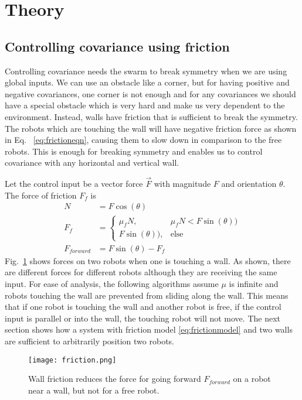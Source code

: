 \section{Theory}
\label{sec:theory}
\subsection{Controlling covariance using friction}

Controlling covariance needs the swarm to break symmetry when we are using global inputs. We can use an obstacle like a corner, but for having positive and negative covariances, one corner is not enough and for any covariances we should have a special obstacle which is very hard and make us very dependent to the environment. Instead, walls have friction that is sufficient to break the symmetry. The robots which are touching the wall will have negative friction force as shown in Eq. ~\ref{eq:frictioneqn}, causing them to slow down in comparison to the free robots. This is enough for breaking symmetry and enables us to control covariance with any horizontal and vertical wall. 
  
 Let the control input be a vector force $\vec{F}$ with magnitude $F$ and orientation $\theta$.  The force of friction $F_f$ is
\begin{align}
N &= F \cos(\theta) \nonumber\\
F_f &= \begin{cases}  \mu_f N, &  \mu_f N < F \sin(\theta))  \label{eq:frictionmodel} \\ 
F \sin(\theta)), & \text{else} \end{cases}  \\%
F_{forward} &=  F \sin(\theta) - F_f  \nonumber
\end{align}
 Fig.~\ref{fig:friction} shows  forces on two robots when one is touching a wall. As shown, there are different forces for different robots although they are receiving the same input.
  For ease of analysis, the following algorithms assume $\mu$ is infinite and robots touching the wall are prevented from sliding along the wall.
This means that if one robot is touching the wall and another robot is free, if the control input is parallel or into the wall, the touching robot will not move. 
The next section shows how a system with friction model \eqref{eq:frictionmodel} and two walls are sufficient to arbitrarily position two robots. 
\begin{figure}[h]
\begin{center}
\texttt{[image: friction.png]} 
\caption{Wall friction reduces the force for going forward $F_{forward}$ on a robot near a wall, but not for a free robot.}
\label{fig:friction}
\end{center}
\end{figure} 




